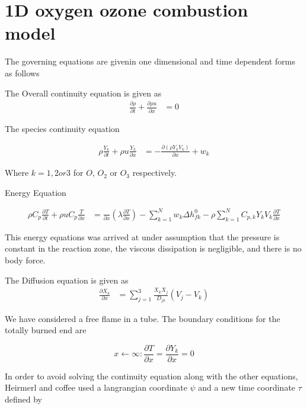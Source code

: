 \section{1D oxygen ozone combustion model}

\noindent The governing equations are givenin one dimensional and time dependent forms as follows 

The Overall continuity equation is given as
\begin{eqnarray}
\frac{\partial \rho}{\partial t} +  \frac{\partial \rho u }{\partial x} &= 0
\end{eqnarray}

The species continuity equation

\begin{eqnarray}
\rho \frac{Y_k}{\partial t} + \rho u \frac{Y_k}{\partial x} &= -\frac{\partial (\rho Y_k V_k)}{\partial x}  + w_k
\end{eqnarray}

\noindent Where $k = 1,2 or 3$ for $O$, $O_2$ or $O_3$ respectively. 

Energy Equation 

\begin{eqnarray}
\rho C_p \frac{\partial T}{\partial t} + \rho u C_p \frac{T}{\partial x} &= \frac{}{\partial x} \left(\lambda \frac{\partial T}{\partial x}\right)  - \sum_{k=1}^{N} w_k \Delta h^0_{fk} - \rho  \sum_{k=1}^{N} C_{p,k} Y_k V_k \frac{\partial T}{\partial x}
\end{eqnarray}

\noindent This energy equations was arrived at under assumption that the pressure is constant in the reaction zone, the viscous dissipation is negligible, and there is no body force. 

\noindent The Diffusion equation is given as 
\begin{eqnarray}
\frac{\partial X_k}{\partial x} &= \sum_{j=1}^{3} \frac{X_k X_j}{D_{jk}} (V_j - V_k)
\end{eqnarray}

\noindent We have considered a free flame in a tube. The boundary conditions for the totally burned end are 

$$x \leftarrow \infty:  \frac{\partial T}{\partial x} = \frac{\partial Y_k}{\partial x} = 0$$

\noindent In order to avoid solving the continuity equation along with the other equations, Heirmerl and coffee\cite{Heimerl} used a langrangian coordinate $\psi$
and a new time coordinate $\tau$ defined by 

